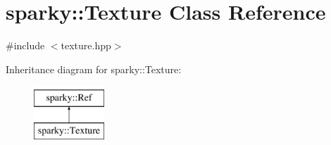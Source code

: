 \hypertarget{classsparky_1_1_texture}{}\section{sparky\+:\+:Texture Class Reference}
\label{classsparky_1_1_texture}


{\ttfamily \#include $<$texture.\+hpp$>$}

Inheritance diagram for sparky\+:\+:Texture\+:\begin{figure}[H]
\begin{center}
\leavevmode
\includegraphics[height=2.000000cm]{classsparky_1_1_texture}
\end{center}
\end{figure}
